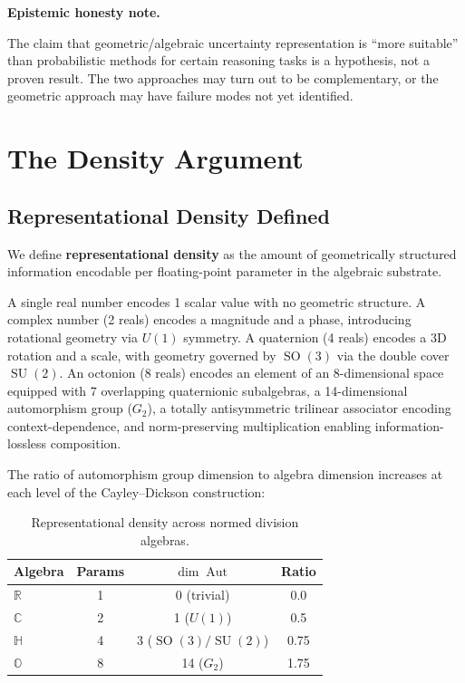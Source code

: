 \documentclass[11pt,a4paper]{article}
\DeclareMathOperator{\Aut}{Aut}
\DeclareMathOperator{\SO}{SO}
\DeclareMathOperator{\SU}{SU}
\newcommand{\Oct}{\mathbb{O}}
\newcommand{\Real}{\mathbb{R}}
\newcommand{\Comp}{\mathbb{C}}
\newcommand{\Quat}{\mathbb{H}}
\newenvironment{epistemicnote}{%
  \medskip\noindent\textbf{Epistemic honesty note.}\itshape\space
}{%
  \medskip
}
\begin{document}
\begin{epistemicnote}
The claim that geometric/algebraic uncertainty representation is ``more suitable'' than probabilistic methods for certain reasoning tasks is a hypothesis, not a proven result. The two approaches may turn out to be complementary, or the geometric approach may have failure modes not yet identified.
\end{epistemicnote}

\section{The Density Argument}
\label{sec:density}

\subsection{Representational Density Defined}

We define \textbf{representational density} as the amount of geometrically structured information encodable per floating-point parameter in the algebraic substrate.

A single real number encodes 1 scalar value with no geometric structure. A complex number (2 reals) encodes a magnitude and a phase, introducing rotational geometry via $U(1)$ symmetry. A quaternion (4 reals) encodes a 3D rotation and a scale, with geometry governed by $\SO(3)$ via the double cover $\SU(2)$. An octonion (8 reals) encodes an element of an 8-dimensional space equipped with 7 overlapping quaternionic subalgebras, a 14-dimensional automorphism group ($G_2$), a totally antisymmetric trilinear associator encoding context-dependence, and norm-preserving multiplication enabling information-lossless composition.

The ratio of automorphism group dimension to algebra dimension increases at each level of the Cayley--Dickson construction:

\begin{table}[ht]
\centering
\caption{Representational density across normed division algebras.}
\label{tab:density}
\begin{tabular}{@{}lccc@{}}
\toprule
Algebra & Params & $\dim\Aut$ & Ratio \\
\midrule
$\Real$ & 1 & 0 (trivial)        & 0.0  \\
$\Comp$ & 2 & 1 ($U(1)$)         & 0.5  \\
$\Quat$ & 4 & 3 ($\SO(3)/\SU(2)$) & 0.75 \\
$\Oct$  & 8 & 14 ($G_2$)          & 1.75 \\
\bottomrule
\end{tabular}
\end{table}
\end{document}
